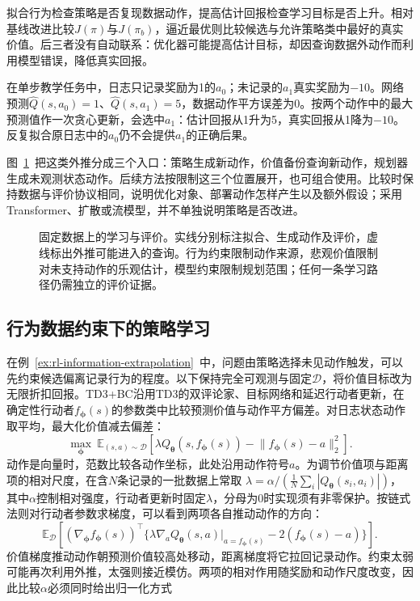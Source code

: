拟合行为检查策略是否复现数据动作，提高估计回报检查学习目标是否上升。相对基线改进比较$J(\pi)$与$J(\pi_b)$，逼近最优则比较候选与允许策略类中最好的真实价值。后三者没有自动联系：优化器可能提高估计目标，却因查询数据外动作而利用模型错误，降低真实回报。

\begin{example}[一次贪心更新利用了外推错误]
  \label{ex:rl-information-extrapolation}
  在单步教学任务中，日志只记录奖励为1的$a_0$；未记录的$a_1$真实奖励为$-10$。网络预测$\widehat Q(s,a_0)=1$、$\widehat Q(s,a_1)=5$，数据动作平方误差为0。按两个动作中的最大预测值作一次贪心更新，会选中$a_1$：估计回报从1升为5，真实回报从1降为$-10$。反复拟合原日志中的$a_0$仍不会提供$a_1$的正确后果。
\end{example}

图~\ref{fig:rl-information-offline-pipeline}~把这类外推分成三个入口：策略生成新动作，价值备份查询新动作，规划器生成未观测状态动作。后续方法按限制这三个位置展开，也可组合使用。比较时保持数据与评价协议相同，说明优化对象、部署动作怎样产生以及额外假设；采用Transformer、扩散或流模型，并不单独说明策略是否改进。

\begin{figure}[htbp]
  \centering
  
  \caption{固定数据上的学习与评价。实线分别标注拟合、生成动作及评价，虚线标出外推可能进入的查询。行为约束限制动作来源，悲观价值限制对未支持动作的乐观估计，模型约束限制规划范围；任何一条学习路径仍需独立的评价证据。}
  \label{fig:rl-information-offline-pipeline}
\end{figure}

\subsection{行为数据约束下的策略学习}
\label{sec:rl-information-behavior-constraint}

在例~\ref{ex:rl-information-extrapolation}~中，问题由策略选择未见动作触发，可以先约束候选偏离记录行为的程度。以下保持完全可观测与固定$\mathcal D$，将价值目标改为无限折扣回报。TD3+BC沿用TD3的双评论家、目标网络和延迟行动者更新，在确定性行动者$f_{\bm\phi}(s)$的参数类中比较预测价值与动作平方偏差。对日志状态动作取平均，最大化价值减去偏差：
\begin{equation}
  \label{eq:rl-information-td3bc}
  \max_{\bm\phi}\ %
  \mathbb E_{(s,a)\sim\mathcal D}
  \left[\lambda Q_{\bm\theta}(s,f_{\bm\phi}(s))
            -\lVert f_{\bm\phi}(s)-a\rVert_2^2\right].
\end{equation}
动作是向量时，范数比较各动作坐标，此处沿用动作符号$a$。为调节价值项与距离项的相对尺度，在含$N$条记录的一批数据上常取
$\lambda=\alpha/(\frac1N\sum_i|Q_{\bm\theta}(s_i,a_i)|)$，
其中$\alpha$控制相对强度，行动者更新时固定$\lambda$，分母为0时实现须有非零保护。按链式法则对行动者参数求梯度，可以看到两项各自推动动作的方向：
\[
  \mathbb E_{\mathcal D}
  \left[(\nabla_{\bm\phi}f_{\bm\phi}(s))^\top
  \{\lambda\nabla_a Q_{\bm\theta}(s,a)|_{a=f_{\bm\phi}(s)}
          -2(f_{\bm\phi}(s)-a)\}\right].
\]
价值梯度推动动作朝预测价值较高处移动，距离梯度将它拉回记录动作。约束太弱可能再次利用外推，太强则接近模仿。两项的相对作用随奖励和动作尺度改变，因此比较$\alpha$必须同时给出归一化方式

